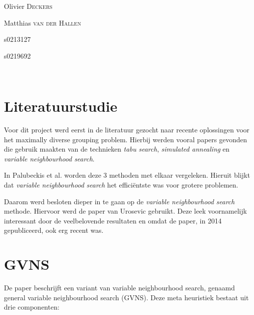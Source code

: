 \documentclass[pdftex,12pt,a4paper]{article}
\begin{document}
\begin{titlepage}
\begin{center}
\begin{minipage}{0.4\textwidth}
\begin{flushleft} \large
Olivier \textsc{Deckers} \\
\end{flushleft}
\begin{flushleft} \large
Matthias \textsc{van der Hallen} \\
\end{flushleft}
\end{minipage}
\begin{minipage}{0.4\textwidth}
\begin{flushright} \large
s0213127
\end{flushright}
\begin{flushright} \large
s0219692\\
\end{flushright}
\end{minipage}\\[1cm]

\end{center}

\end{titlepage}

\thispagestyle{empty}  
\setcounter{page}{0}
\newpage
\setcounter{page}{1}

\tableofcontents
\newpage

\section{Literatuurstudie}
Voor dit project werd eerst in de literatuur gezocht naar recente oplossingen voor het maximally diverse grouping problem. Hierbij werden vooral papers gevonden die gebruik maakten van de technieken \emph{tabu search}, \emph{simulated annealing} en \emph{variable neighbourhood search}.

In Palubeckis et al.\cite{Palubeckis} worden deze 3 methoden met elkaar vergeleken. Hieruit blijkt dat \emph{variable neighbourhood search} het effici\"entste was voor grotere problemen. 

Daarom werd besloten dieper in te gaan op de \emph{variable neighbourhood search} methode. Hiervoor werd de paper van Urosevic\cite{Urosevic} gebruikt. Deze leek voornamelijk interessant door de veelbelovende resultaten en omdat de paper, in 2014 gepubliceerd, ook erg recent was. 

\section{GVNS}
De paper beschrijft een variant van variable neighbourhood search, genaamd general variable neighbourhood search (GVNS). Deze meta heuristiek bestaat uit drie componenten:
\end{document}
